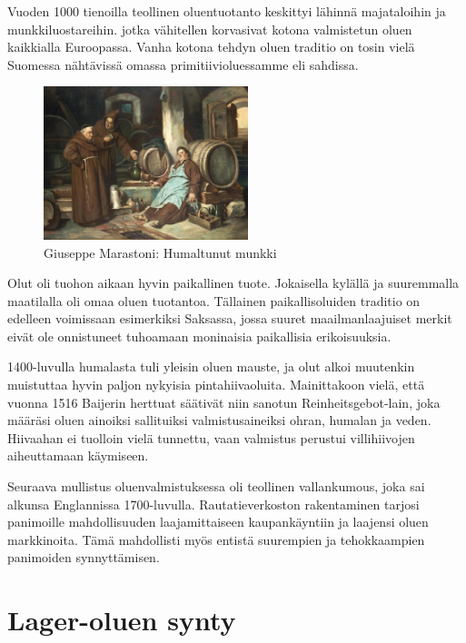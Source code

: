 \documentclass[a4paper,11pt]{report}
\begin{document}
Vuoden 1000 tienoilla teollinen oluentuotanto keskittyi lähinnä majataloihin ja munkkiluostareihin. jotka vähitellen korvasivat kotona valmistetun oluen kaikkialla Euroopassa. Vanha kotona tehdyn oluen traditio on tosin vielä Suomessa nähtävissä omassa primitiivioluessamme eli sahdissa.
\begin{figure}
  \begin{center}
    \includegraphics[width=0.53\textwidth]{drunkmonk}
    \caption{Giuseppe Marastoni: Humaltunut munkki}
  \end{center}
  \end{figure}

Olut oli tuohon aikaan hyvin paikallinen tuote. Jokaisella kylällä ja suuremmalla maatilalla oli omaa oluen tuotantoa. Tällainen paikallisoluiden traditio on edelleen voimissaan esimerkiksi Saksassa, jossa suuret maailmanlaajuiset merkit eivät ole onnistuneet tuhoamaan moninaisia paikallisia erikoisuuksia.

1400-luvulla humalasta tuli yleisin oluen mauste, ja olut alkoi muutenkin muistuttaa hyvin paljon nykyisia pintahiivaoluita. Mainittakoon vielä, että vuonna 1516 Baijerin herttuat säätivät niin sanotun Reinheitsgebot-lain, joka määräsi oluen ainoiksi sallituiksi valmistusaineiksi ohran, humalan ja veden. Hiivaahan ei tuolloin vielä tunnettu, vaan valmistus perustui villihiivojen aiheuttamaan käymiseen.

Seuraava mullistus oluenvalmistuksessa oli teollinen vallankumous, joka sai alkunsa Englannissa 1700-luvulla. Rautatieverkoston rakentaminen tarjosi panimoille mahdollisuuden laajamittaiseen kaupankäyntiin ja laajensi oluen markkinoita. Tämä mahdollisti myös entistä suurempien ja tehokkaampien panimoiden synnyttämisen.

\section{Lager-oluen synty}
\end{document}
